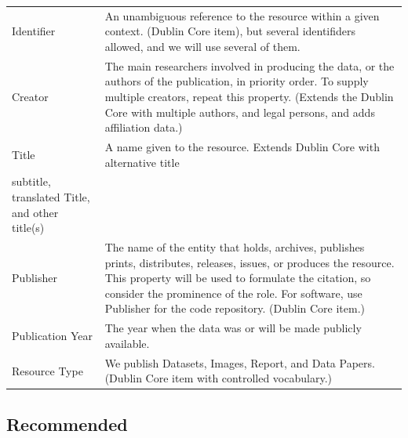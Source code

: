 \documentclass[
  a4paper,
  openany, a4paper, oneside]{book}
\begin{document}
\begin{longtable}[]{@{}
  >{\raggedright\arraybackslash}p{}
  >{\centering\arraybackslash}p{}@{}}
\toprule
& \\
\midrule
\endhead
Identifier & An unambiguous reference to the resource within a given context. (Dublin Core item), but several identifiders allowed, and we will use several of them. \\
Creator & The main researchers involved in producing the data, or the authors of the publication, in priority order. To supply multiple creators, repeat this property. (Extends the Dublin Core with multiple authors, and legal persons, and adds affiliation data.) \\
Title & A name given to the resource. Extends Dublin Core with alternative title \\
subtitle, translated Title, and other title(s) & \\
Publisher & The name of the entity that holds, archives, publishes prints, distributes, releases, issues, or produces the resource. This property will be used to formulate the citation, so consider the prominence of the role. For software, use Publisher for the code repository. (Dublin Core item.) \\
Publication Year & The year when the data was or will be made publicly available. \\
Resource Type & We publish Datasets, Images, Report, and Data Papers. (Dublin Core item with controlled vocabulary.) \\
\bottomrule
\end{longtable}

\hypertarget{recommended}{%
\subsection{Recommended}\label{recommended}}
\end{document}
